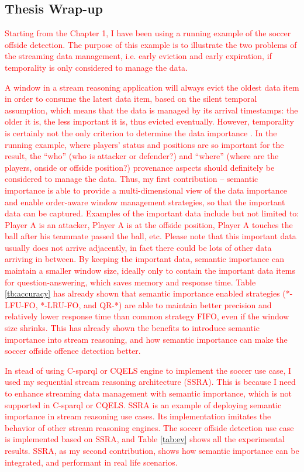\subsection{Thesis Wrap-up}
\textcolor{red}{
Starting from the Chapter 1, I have been using a running example of the soccer offside detection.
The purpose of this example is to illustrate the two problems of the streaming data management, i.e. early eviction and early expiration, if temporality is only considered to manage the data.
}

\textcolor{red}{
A window in a stream reasoning application will always evict the oldest data item in order to consume the latest data item, based on the silent temporal assumption, which means that the data is managed by its arrival timestamps: the older it is, the less important it is, thus evicted eventually. 
However, temporality is certainly not the only criterion to determine the data importance . 
In the running example, where players' status and positions are so important for the result, the ``who'' (who is attacker or defender?) and ``where'' (where are the players, onside or offside position?) provenance aspects should definitely be considered to manage the data. 
Thus, my first contribution -- semantic importance is able to provide a multi-dimensional view of the data importance and enable order-aware window management strategies, so that the important data can be captured.
Examples of the important data include but not limited to: Player A is an attacker, Player A is at the offside position, Player A touches the ball after his teammate passed the ball, etc. 
Please note that this important data usually does not arrive adjacently, in fact there could be lots of other data arriving in between.
By keeping the important data, semantic importance can maintain a smaller window size, ideally only to contain the important data items for question-answering, which saves memory and response time.
Table \ref{tb:accuracy} has already shown that semantic importance enabled strategies (*-LFU-FO, *-LRU-FO, and QR-*) are able to maintain better precision and relatively lower response time than common strategy FIFO, even if the window size shrinks.
This has already shown the benefits to introduce semantic importance into stream reasoning, and how semantic importance can make the soccer offside offence detection better.
}

\textcolor{red}{
In stead of using C-sparql or CQELS engine to implement the soccer use case, I used my sequential stream reasoning architecture (SSRA).
This is because I need to enhance streaming data management with semantic importance, which is not supported in C-sparql or CQELS. 
SSRA is an example of deploying semantic importance in stream reasoning use cases. 
Its implementation imitates the behavior of other stream reasoning engines.
The soccer offside detection use case is implemented based on SSRA, and Table \ref{tab:ev} shows all the experimental results.
SSRA, as my second contribution, shows how semantic importance can be integrated, and performant in real life scenarios. 
}

